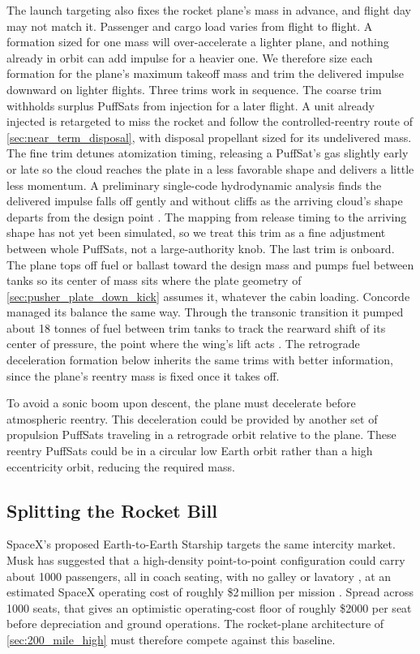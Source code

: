 \documentclass{article}
\begin{document}
The launch targeting also fixes the rocket plane's mass in advance, and flight day may not match it. Passenger and cargo load varies from flight to flight. A formation sized for one mass will over-accelerate a lighter plane, and nothing already in orbit can add impulse for a heavier one. We therefore size each formation for the plane's maximum takeoff mass and trim the delivered impulse downward on lighter flights. Three trims work in sequence. The coarse trim withholds surplus PuffSats from injection for a later flight. A unit already injected is retargeted to miss the rocket and follow the controlled-reentry route of \autoref{sec:near_term_disposal}, with disposal propellant sized for its undelivered mass. The fine trim detunes atomization timing, releasing a PuffSat's gas slightly early or late so the cloud reaches the plate in a less favorable shape and delivers a little less momentum. A preliminary single-code hydrodynamic analysis finds the delivered impulse falls off gently and without cliffs as the arriving cloud's shape departs from the design point \cite{Katz_puffsat_impact_sim_2026}. The mapping from release timing to the arriving shape has not yet been simulated, so we treat this trim as a fine adjustment between whole PuffSats, not a large-authority knob. The last trim is onboard. The plane tops off fuel or ballast toward the design mass and pumps fuel between tanks so its center of mass sits where the plate geometry of \autoref{sec:pusher_plate_down_kick} assumes it, whatever the cabin loading. Concorde managed its balance the same way. Through the transonic transition it pumped about 18 tonnes of fuel between trim tanks to track the rearward shift of its center of pressure, the point where the wing's lift acts \cite{rech_leyman_concorde_2003, yoon_concorde_fuel_2004}. The retrograde deceleration formation below inherits the same trims with better information, since the plane's reentry mass is fixed once it takes off.

To avoid a sonic boom upon descent, the plane must decelerate before atmospheric reentry. This deceleration could be provided by another set of propulsion PuffSats traveling in a retrograde orbit relative to the plane. These reentry PuffSats could be in a circular low Earth orbit rather than a high eccentricity orbit, reducing the required mass.

\subsection{Splitting the Rocket Bill}\label{sec:fare_comparison}
SpaceX's proposed Earth-to-Earth Starship targets the same intercity market. Musk has suggested that a high-density point-to-point configuration could carry about 1000 passengers, all in coach seating, with no galley or lavatory \cite{musk_p2p_capacity}, at an estimated SpaceX operating cost of roughly \$2\,million per mission \cite{spacex_starship_cost}. Spread across 1000 seats, that gives an optimistic operating-cost floor of roughly \$2000 per seat before depreciation and ground operations. The rocket-plane architecture of \autoref{sec:200_mile_high} must therefore compete against this baseline.
\end{document}
